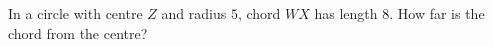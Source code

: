 In a circle with centre $Z$ and radius $5$, chord $WX$ has length $8$. How far is the chord from the centre?
